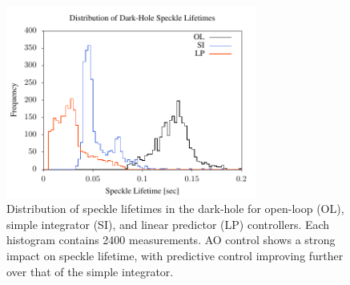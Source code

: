\documentclass[10pt,preprint]{aastex631}
\newcommand{\jrmadd}[1]{\textcolor{blue}{#1}}
\begin{document}
\begin{figure}[h]
\centering
\includegraphics[width=3.25in]{slHist.pdf}
\caption{Distribution of speckle lifetimes in the dark-hole for open-loop (OL), simple integrator (SI), and linear predictor (LP) controllers. Each histogram contains 2400 measurements.  AO control shows a strong impact on speckle lifetime, with predictive control improving further over that of the simple integrator. 
\label{fig:slHist}
}
\end{figure}





\end{document}
